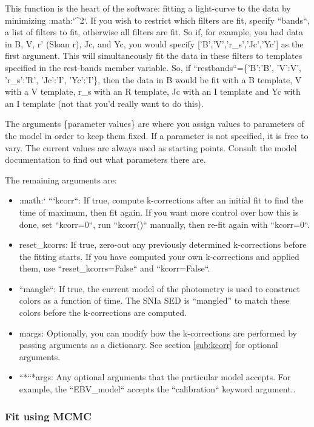 This function is the heart of the software: fitting a light-curve
to the data by minimizing :math:`\chi^{2}`. If you wish to restrict which
filters are fit, specify ``bands``, a list of filters to fit,
otherwise all filters are fit. So if, for example, you had data in
B, V, r' (Sloan r), Jc, and Yc, you would specify {[}'B','V','r_s','Jc','Yc'{]}
as the first argument. This will simultaneously fit the data in these
filters to templates specified in the rest-bands member variable.
So, if ``restbands``=\{'B':'B', 'V':V', 'r_s':'R', 'Jc':'I',
'Yc':'I'\}, then the data in B would be fit with a B template, V with
a V template, r_s with an R template, Jc with an I template and Yc
with an I template (not that you'd really want to do this). 

The arguments \{parameter values\} are where you assign values to
parameters of the model in order to keep them fixed. If a parameter
is not specified, it is free to vary. The current values are always
used as starting points. Consult the model documentation to find out
what parameters there are.

The remaining arguments are:
\begin{itemize}
\item :math:` ```kcorr``: If true, compute k-corrections after an initial
fit to find the time of maximum, then fit again. If you want more
control over how this is done, set ``kcorr=0``, run ``kcorr()``
manually, then re-fit again with ``kcorr=0``.
\item reset_kcorrs: If true, zero-out any previously determined k-corrections
before the fitting starts. If you have computed your own k-corrections
and applied them, use ``reset_kcorrs=False`` and ``kcorr=False``.
\item ``mangle``: If true, the current model of the photometry is used
to construct colors as a function of time. The SNIa SED is ``mangled''
to match these colors before the k-corrections are computed.
\item margs: Optionally, you can modify how the k-corrections are performed
by passing arguments as a dictionary. See section \ref{sub:kcorr}
for optional arguments.
\item ``{*``{*}args}: Any optional arguments that the particular model
accepts. For example, the ``EBV_model`` accepts the ``calibration``
keyword argument..
\end{itemize}

\subsubsection{Fit using MCMC\label{sub:Fit-MCMC}}

